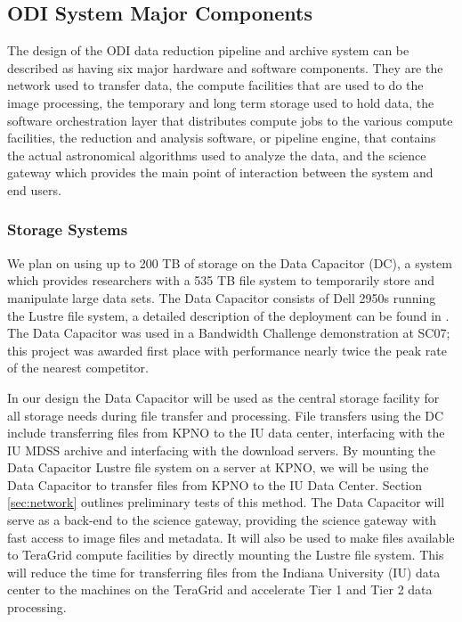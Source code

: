 \documentclass[10pt,conference]{IEEEtran}
\begin{document}
\subsection{ODI System Major Components}\label{sec:components}

The design of the ODI data reduction pipeline and archive system can be described as having six major hardware and software components. They are the network used to transfer data, the compute facilities that are used to do the image processing, the temporary and long term storage used to hold data, the software orchestration layer that distributes compute jobs to the various compute facilities, the reduction and analysis software, or pipeline engine, that contains the actual astronomical algorithms used to analyze the data, and the science gateway which provides the main point of interaction between the system and end users. 

\subsubsection{Storage Systems}

We plan on using up to 200 TB of storage on the Data Capacitor (DC), a system which provides researchers with a 535 TB file system to temporarily store and manipulate large data sets. The Data Capacitor consists of Dell 2950s running the Lustre file system, a detailed description of the deployment can be found in \cite{simms2007}. The Data Capacitor was used in a Bandwidth Challenge demonstration at SC07; this project was awarded first place with performance nearly twice the peak rate of the nearest competitor.

In our design the Data Capacitor will be used as the central storage facility for all storage needs during file transfer and processing. File transfers using the DC include transferring files from KPNO to the IU data center, interfacing with the IU MDSS archive and interfacing with the download servers. By mounting the Data Capacitor Lustre file system on a server at KPNO, we will be using the Data Capacitor to transfer files from KPNO to the IU Data Center. Section \ref{sec:network} outlines preliminary tests of this method. The Data Capacitor will serve as a back-end to the science gateway, providing the science gateway with fast access to image files and metadata. It will also be used to make files available to TeraGrid compute facilities by directly mounting the Lustre file system. This will reduce the time for transferring files from the Indiana University (IU) data center to the machines on the TeraGrid and accelerate Tier 1 and Tier 2 data processing.
\end{document}
